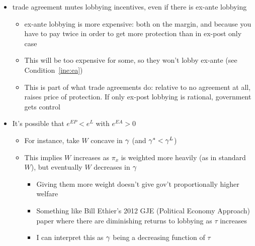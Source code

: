 \begin{itemize}					
	\item trade agreement mutes lobbying incentives, even if there is ex-ante lobbying
		\begin{itemize}
			\item ex-ante lobbying is more expensive: both on the margin, and because you have to pay twice in order to get more protection than in ex-post only case
			\item This will be too expensive for some, so they won't lobby ex-ante (see Condition~\ref{ine:ea})
			\item This is part of what trade agreements do: relative to no agreement at all, raises price of protection. If only ex-post lobbying is rational, government gets control
		\end{itemize}

		
	 \item It's possible that $e^{EP} < e^{L}$ with $e^{EA} > 0$
		\begin{itemize}
			\item For instance, take $W$ concave in $\gamma$ (and $\gamma^* < \gamma^L$)
			\item This implies $W$ increases as $\pi_x$ is weighted more heavily (as in standard $W$), but eventually $W$ decreases in $\gamma$
				\begin{itemize}
					\item Giving them more weight doesn't give gov't proportionally higher welfare
					\item Something like Bill Ethier's 2012 GJE (Political Economy Approach) paper where there are diminishing returns to lobbying as $\tau$ increases
					\item I can interpret this as $\gamma$ being a decreasing function of $\tau$
				\end{itemize}
		\end{itemize}
\end{itemize}



